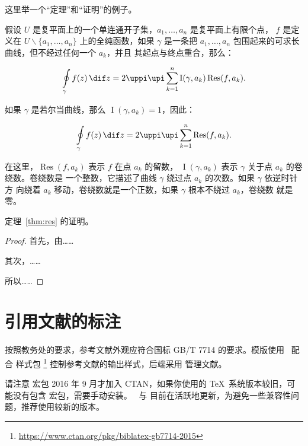这里举一个“定理”和“证明”的例子。
\begin{theorem}[留数定理]
\label{thm:res}
  假设 $U$ 是复平面上的一个单连通开子集，$a_1, \ldots, a_n$ 是复平面上有限个点，
  $f$ 是定义在 $U \backslash \{a_1, \ldots, a_n\}$ 上的全纯函数，如果 $\gamma$
  是一条把 $a_1, \ldots, a_n$ 包围起来的可求长曲线，但不经过任何一个 $a_k$，并且
  其起点与终点重合，那么：

  \begin{equation}
    \label{eq:res}
    \ointop_\gamma f(z)\, \dif z = 2\uppi \upi \sum_{k=1}^n \operatorname{I}(\gamma, a_k) \operatorname{Res}(f, a_k).
  \end{equation}

  如果 $\gamma$ 是若尔当曲线，那么 $\operatorname{I}(\gamma, a_k) = 1$，因此：

  \begin{equation}
    \label{eq:resthm}
    \ointop_\gamma f(z)\, \dif z = 2\uppi \upi \sum_{k=1}^n \operatorname{Res}(f, a_k).
  \end{equation}

  在这里，$\operatorname{Res}(f, a_k)$ 表示 $f$ 在点 $a_k$ 的留数，
  $\operatorname{I}(\gamma, a_k)$ 表示 $\gamma$ 关于点 $a_k$ 的卷绕数。卷绕数是
  一个整数，它描述了曲线 $\gamma$ 绕过点 $a_k$ 的次数。如果 $\gamma$ 依逆时针方
  向绕着 $a_k$ 移动，卷绕数就是一个正数，如果 $\gamma$ 根本不绕过 $a_k$，卷绕数
  就是零。

  定理~\ref{thm:res} 的证明。

  \begin{proof}
    首先，由……

    其次，……

    所以……
  \end{proof}
\end{theorem}

\section{引用文献的标注}

按照教务处的要求，参考文献外观应符合国标 GB/T 7714 的要求。模版使用 \BibLaTeX\
配合  样式包
\footnote{\url{https://www.ctan.org/pkg/biblatex-gb7714-2015}}
控制参考文献的输出样式，后端采用  管理文献。

请注意  宏包 2016 年 9 月才加入 CTAN，如果你使用的
\TeX\ 系统版本较旧，可能没有包含  宏包，需要手动安装。
\BibLaTeX\ 与 \pkg{biblatex-gb7714-2015} 目前在活跃地更新，为避免一些兼容性问
题，推荐使用较新的版本。

